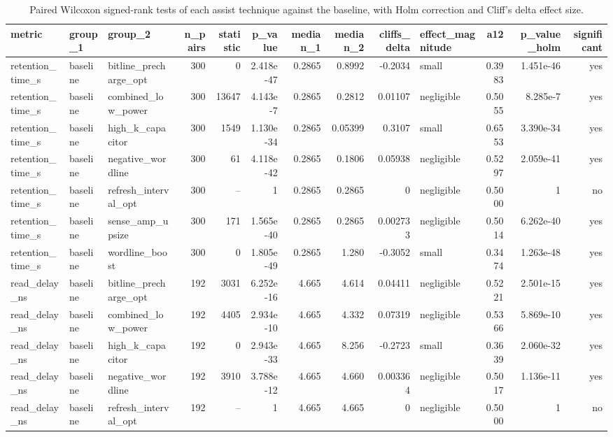\begin{table}[!t]
\centering
\caption{Paired Wilcoxon signed-rank tests of each assist technique against the baseline, with Holm correction and Cliff's delta effect size.}
\label{tab:assist_significance_main}
\footnotesize
\begin{tabular}{lllrrrrrrlrrr}
\toprule
metric & group\_1 & group\_2 & n\_pairs & statistic & p\_value & median\_1 & median\_2 & cliffs\_delta & effect\_magnitude & a12 & p\_value\_holm & significant \\
\midrule
retention\_time\_s & baseline & bitline\_precharge\_opt & 300 & 0 & 2.418e-47 & 0.2865 & 0.8992 & -0.2034 & small & 0.3983 & 1.451e-46 & yes \\
retention\_time\_s & baseline & combined\_low\_power & 300 & 13647 & 4.143e-7 & 0.2865 & 0.2812 & 0.01107 & negligible & 0.5055 & 8.285e-7 & yes \\
retention\_time\_s & baseline & high\_k\_capacitor & 300 & 1549 & 1.130e-34 & 0.2865 & 0.05399 & 0.3107 & small & 0.6553 & 3.390e-34 & yes \\
retention\_time\_s & baseline & negative\_wordline & 300 & 61 & 4.118e-42 & 0.2865 & 0.1806 & 0.05938 & negligible & 0.5297 & 2.059e-41 & yes \\
retention\_time\_s & baseline & refresh\_interval\_opt & 300 & -- & 1 & 0.2865 & 0.2865 & 0 & negligible & 0.5000 & 1 & no \\
retention\_time\_s & baseline & sense\_amp\_upsize & 300 & 171 & 1.565e-40 & 0.2865 & 0.2865 & 0.002733 & negligible & 0.5014 & 6.262e-40 & yes \\
retention\_time\_s & baseline & wordline\_boost & 300 & 0 & 1.805e-49 & 0.2865 & 1.280 & -0.3052 & small & 0.3474 & 1.263e-48 & yes \\
read\_delay\_ns & baseline & bitline\_precharge\_opt & 192 & 3031 & 6.252e-16 & 4.665 & 4.614 & 0.04411 & negligible & 0.5221 & 2.501e-15 & yes \\
read\_delay\_ns & baseline & combined\_low\_power & 192 & 4405 & 2.934e-10 & 4.665 & 4.332 & 0.07319 & negligible & 0.5366 & 5.869e-10 & yes \\
read\_delay\_ns & baseline & high\_k\_capacitor & 192 & 0 & 2.943e-33 & 4.665 & 8.256 & -0.2723 & small & 0.3639 & 2.060e-32 & yes \\
read\_delay\_ns & baseline & negative\_wordline & 192 & 3910 & 3.788e-12 & 4.665 & 4.660 & 0.003364 & negligible & 0.5017 & 1.136e-11 & yes \\
read\_delay\_ns & baseline & refresh\_interval\_opt & 192 & -- & 1 & 4.665 & 4.665 & 0 & negligible & 0.5000 & 1 & no \\

\end{tabular}
\end{table}
